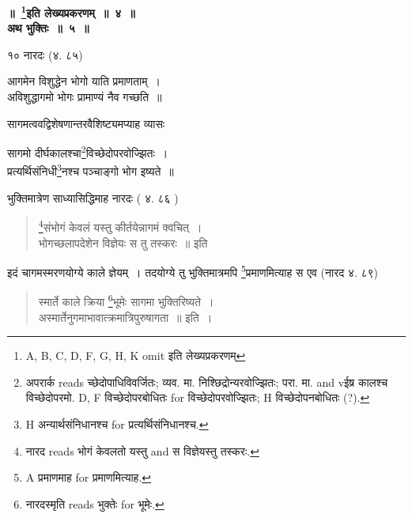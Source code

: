 \documentclass[11pt, openany]{book}
\begin{document}
\begin{center}
\textbf{\Large ॥~\renewcommand{\thefootnote}{2}\footnote{A, B, C, D, F, G, H, K omit इति लेख्यप्रकरणम्}इति लेख्यप्रकरणम्~॥~४~॥}\\

\vspace{2mm}
\textbf{\Large अथ भुक्तिः~॥~५~॥}
\end{center}

१० नारदः (४. ८५)

\begin{center}
{\vy आगमेन विशुद्धेन भोगो याति प्रमाणताम्~।\\
अविशुद्धागमो भोगः प्रामाण्यं नैव गच्छति~॥}
\end{center}

सागमत्ववद्विशेषणान्तरवैशिष्ट्यमप्याह व्यासः

\begin{center}
{\vy सागमो दीर्घकालश्चा\renewcommand{\thefootnote}{3}\footnote{अपरार्क reads {\qt च्छेदोपाधिविवर्जितः}; व्यव. मा. {\qt निश्छिद्रोन्यरवोज्झितः}; परा. मा. and vईष्र {\qt कालश्च विच्छेदोपरमो}. D, F विच्छेदोपरबोधितः for विच्छेदोपरवोज्झितः; H विच्छेदोपनबोधितः (?).}विच्छेदोपरवोज्झितः~।\\
प्रत्यर्थिसंनिधी\renewcommand{\thefootnote}{4}\footnote{H अन्यार्थसंनिधानश्च for प्रत्यर्थिसंनिधानश्च.}नश्च पञ्चाङ्गो भोग इष्यते~॥}
\end{center}

भुक्तिमात्रेण साध्यासिद्धिमाह नारदः ( ४. ८६ )

\begin{quote}
{\vy \renewcommand{\thefootnote}{5}\footnote{नारद reads भोगं केवलतो यस्तु and स विज्ञेयस्तु तस्करः.}संभोगं केवलं यस्तु कीर्तयेन्नागमं क्वचित्~।\\
भोगच्छलापदेशेन विज्ञेयः स तु तस्करः~॥} इति
\end{quote}

\newpage
{}
\fancyhead[RO]{[ $\S$ ५ }
\fancyhead[LE]{$\S$ ५ ]}

\noindent
इदं चागमस्मरणयोग्ये काले ज्ञेयम्~। तदयोग्ये तु भुक्तिमात्रमपि \renewcommand{\thefootnote}{1}\footnote{A प्रमाणमाह for प्रमाणमित्याह.}प्रमाणमित्याह स एव (नारद ४. ८९)

\begin{quote}
{\vy स्मार्ते काले क्रिया \renewcommand{\thefootnote}{2}\footnote{नारदस्मृति reads भुक्तेः for भूमेः.}भूमेः सागमा भुक्तिरिष्यते~।\\
अस्मार्तेनुगमाभावात्क्रमात्रिपुरुषागता~॥} इति~।
\end{quote}
\end{document}
